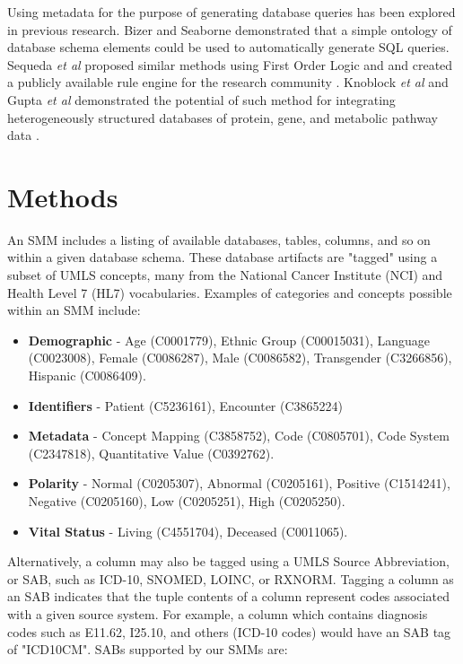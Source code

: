 \documentclass[../main.tex]{subfiles}
\begin{document}
Using metadata for the purpose of generating database queries has been explored in previous research. Bizer and Seaborne \cite{bizertreating} demonstrated that a simple ontology of database schema elements could be used to automatically generate SQL queries. Sequeda \textit{et al} proposed similar methods using First Order Logic and and created a publicly available rule engine for the research community \cite{sequeda2009direct,sequeda2011survey}. Knoblock \textit{et al} and Gupta \textit{et al} demonstrated the potential of such method for integrating heterogeneously structured databases of protein, gene, and metabolic pathway data \cite{knoblock2012semi, gupta2015karma}.

\section{Methods}

An SMM includes a listing of available databases, tables, columns, and so on within a given database schema. These database artifacts are "tagged" using a subset of UMLS concepts, many from the National Cancer Institute (NCI) and Health Level 7 (HL7) vocabularies. Examples of categories and concepts possible within an SMM include:

\begin{itemize}
    \item \textbf{Demographic} - Age (C0001779), Ethnic Group (C00015031), Language (C0023008), Female (C0086287), Male (C0086582), Transgender (C3266856), Hispanic (C0086409). 
    \item \textbf{Identifiers} - Patient (C5236161), Encounter (C3865224)
    \item \textbf{Metadata} - Concept Mapping (C3858752), Code (C0805701), Code System (C2347818), Quantitative Value (C0392762).
    \item \textbf{Polarity} - Normal (C0205307), Abnormal (C0205161), Positive (C1514241), Negative (C0205160), Low (C0205251), High (C0205250).
    \item \textbf{Vital Status} - Living (C4551704), Deceased (C0011065).
\end{itemize}

Alternatively, a column may also be tagged using a UMLS Source Abbreviation, or SAB, such as ICD-10, SNOMED, LOINC, or RXNORM. Tagging a column as an SAB indicates that the tuple contents of a column represent codes associated with a given source system. For example, a column which contains diagnosis codes such as E11.62, I25.10, and others (ICD-10 codes) would have an SAB tag of "ICD10CM". SABs supported by our SMMs are:
\end{document}
